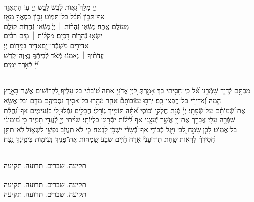\documentclass[twoside, openany, parskip=half, 11pt]{book}
\begin{document}
{\\
\vspace{-1.5\baselineskip}
\begin{narrow}
יְיָ֣ מָלָךְ֮ גֵּא֢וּת לָ֫בֵ֥שׁ\hfill
לָבֵ֣שׁ יְיָ֭ עֹ֣ז הִתְאַזָּ֑ר\\ אַף־תִּכּ֥וֹן תֵּ֝בֵ֗ל בַּל־תִּמּֽוֹט׃ \hfill
נָכ֣וֹן כִּסְאֲךָ֣ מֵאָ֑ז\\ מֵעוֹלָ֣ם אָֽתָּה׃ \hfill
נָשְֿׂא֤וּ נְֿהָר֨וֹת ׀ יְיָ֗ נָשְֿׂא֣וּ נְֿהָר֣וֹת קוֹלָ֑ם\\ יִשְׂא֖וּ נְֿהָר֣וֹת דׇּכְיָֽם׃ \hfill
מִקֹּל֨וֹת ׀ מַ֤יִם רַבִּ֗ים\\ אַדִּירִ֣ים מִשְׁבְּֿֿרֵי־יָ֑ם\hfill אַדִּ֖יר בַּמָּר֣וֹם יְיָ׃ \\
עֵֽדֹתֶ֨יךָ ׀ נֶאֶמְנ֬וּ מְֿאֹ֗ד \hfill לְֿבֵיתְֿךָ֥ נַאֲוָה־קֹ֑דֶשׁ\\ יְ֝יָ֗ לְֿאֹ֣רֶךְ יָמִֽים׃ \hfill \break
\end{narrow}
}

\weekdayshir

\label{kaddish_yasom_shacharis}


\mournerskaddish

\begin{sometimes}

\\
%
מִכְתָּ֥ם לְֿדָוִ֑ד שָׁמְֿרֵ֥נִי אֵ֝֗ל כִּֽי־חָסִ֥יתִי בָֽךְ׃ אָמַ֣רְתְּ לַ֭יְיָ אֲדֹנָי֥ אַֽתָּה ט֝וֹבָתִ֗י בַּל־עָלֶֽיךָ׃ לִ֭קְדוֹשִׁים אֲשֶׁר־בָּאָ֣רֶץ הֵ֑מָּה וְֿ֝אַדִּירֵ֗י כׇּל־חֶפְצִי־בָֽם׃ יִרְבּ֥וּ עַצְּֿבוֹתָם֘ אַחֵ֢ר מָ֫הָ֥רוּ בַּל־אַסִּ֣יךְ נִסְכֵּיהֶ֣ם מִדָּ֑ם וּבַל־אֶשָּׂ֥א אֶת־שְֿׁ֝מוֹתָ֗ם עַל־שְֿׂפָתָֽי׃ יְיָ֗ מְֿנָת חֶלְקִ֣י וְֿכוֹסִ֑י אַ֝תָּ֗ה תּוֹמִ֥יךְ גּֽוֹרָלִֽי׃ חֲבָלִ֣ים נָֽפְֿלוּ־לִ֭י בַּנְּֿעִימִ֑ים אַף־נַֽ֝חֲלָ֗ת שָֽׁפְֿרָ֥ה עָלָֽי׃ אֲבָרֵ֣ךְ אֶת־יְ֖יָ אֲשֶׁ֣ר יְֿעָצָ֑נִי אַף לֵ֝יל֗וֹת יִסְּֿר֥וּנִי כִלְיוֹתָֽי׃ שִׁוִּ֨יתִי יְיָ֣ לְֿנֶגְדִּ֣י תָמִ֑יד כִּ֥י מִ֝ימִינִ֗י בַּל־אֶמּֽוֹט׃ לָכֵ֤ן שָׂמַ֣ח לִ֭בִּי וַיָּ֣גֶל כְּֿבוֹדִ֑י אַף־בְּֿֿ֝שָׂרִ֗י יִשְׁכֹּ֥ן לָבֶֽטַח׃ כִּ֤י לֹא תַֽעֲזֹ֣ב נַפְשִׁ֣י לִשְׁא֑וֹל לֹֽא־תִתֵּ֥ן חֲ֝סִֽידְֿךָ֗ לִרְא֥וֹת שָֽׁחַת׃ תּ֤וֹדִיעֵנִי֘ אֹ֢רַח חַ֫יִּ֥ים שׂ֣בַע שְֿׂ֭מָחוֹת אֶת־פָּנֶ֑יךָ נְֿעִימ֖וֹת בִּימִֽינְֿךָ֣ נֶֽצַח׃

\end{sometimes}



\begin{sometimes}

\\
תקיעה. שברים. תרועה. תקיעה\\
\\
תקיעה. שברים. תרועה. תקיעה\\
תקיעה. שברים. תרועה. תקיעה

\end{sometimes}
\end{document}
